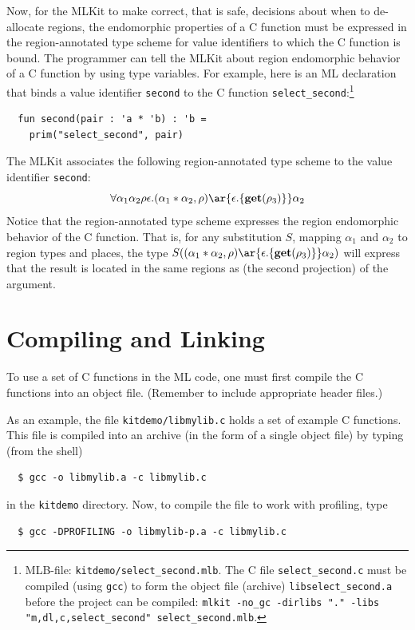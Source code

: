 \documentclass[12pt]{book}
\begin{document}
Now, for the MLKit to make correct, that is safe, decisions about when
to de-allocate regions, the endomorphic properties of a C function
must be expressed in the region-annotated type scheme for value identifiers
to which the C function is bound. The programmer can tell the MLKit
about region endomorphic behavior of a C function by using type
variables.  For example, here is an ML declaration that binds a value
identifier {\tt second} to the C function
\verb|select_second|:\footnote{MLB-file: {\tt kitdemo/select\_second.mlb}. The C
  file {\tt select\_second.c} must be compiled (using {\tt gcc}) to
  form the object file (archive) {\tt libselect\_second.a} before the project can
  be compiled: \texttt{mlkit -no\_gc -dirlibs "." -libs "m,dl,c,select\_second" select\_second.mlb}.}
\begin{verbatim}
  fun second(pair : 'a * 'b) : 'b =
    prim("select_second", pair)
\end{verbatim}
The MLKit associates the following region-annotated type scheme to the value
identifier {\tt second}:
$$\forall \alpha_1\alpha_2\rho\epsilon.(\alpha_1 * \alpha_2, \rho)
\ar{\epsilon.\{\Get(\rho_3)\}} \alpha_2$$ Notice that the
region-annotated type scheme expresses the region endomorphic behavior
of the C function. That is, for any substitution $S$, mapping
$\alpha_1$ and $\alpha_2$ to region types and places, the type
$S((\alpha_1 * \alpha_2, \rho) \ar{\epsilon.\{\Get(\rho_3)\}}
\alpha_2)$ will express that the result is located in the same regions
as (the second projection) of the argument.


\section{Compiling and Linking}
\label{comp_and_link_with_C.sec}
To use a set of C functions in the ML code, one must first compile the
C functions into an object file. (Remember to include appropriate
header files.)

As an example, the file \verb|kitdemo/libmylib.c| holds a set of
example C functions. This file is compiled into an archive (in the
form of a single object file) by typing (from the shell)
\begin{verbatim}
  $ gcc -o libmylib.a -c libmylib.c
\end{verbatim}
in the {\tt kitdemo} directory. Now, to compile the file to work with
profiling, type
\begin{verbatim}
  $ gcc -DPROFILING -o libmylib-p.a -c libmylib.c
\end{verbatim}
\end{document}
